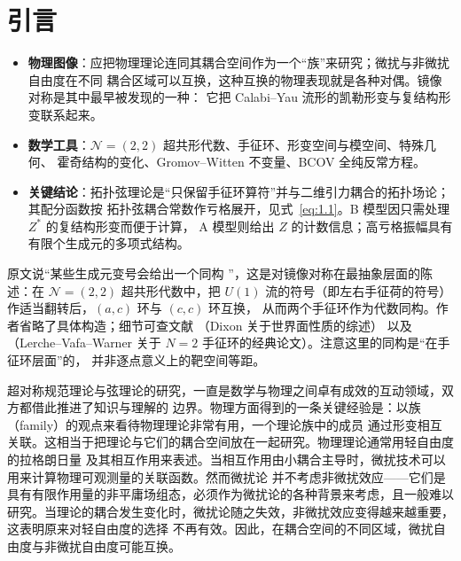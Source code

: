 
\section{引言}
\label{sec:1}


\begin{keytakeaways}
  \begin{itemize}[leftmargin=1.4em,itemsep=2pt,topsep=2pt]
    \item \textbf{物理图像}：应把物理理论连同其耦合空间作为一个“族”来研究；微扰与非微扰自由度在不同
          耦合区域可以互换，这种互换的物理表现就是各种对偶。镜像对称是其中最早被发现的一种：
          它把 Calabi--Yau 流形的凯勒形变与复结构形变联系起来。
    \item \textbf{数学工具}：$\mathcal{N}=(2,2)$ 超共形代数、手征环、形变空间与模空间、特殊几何、
          霍奇结构的变化、Gromov--Witten 不变量、BCOV 全纯反常方程。
    \item \textbf{关键结论}：拓扑弦理论是“只保留手征环算符”并与二维引力耦合的拓扑场论；其配分函数按
          拓扑弦耦合常数作亏格展开，见式~\eqref{eq:1.1}。B 模型因只需处理 $Z^*$ 的复结构形变而便于计算，
          A 模型则给出 $Z$ 的计数信息；高亏格振幅具有有限个生成元的多项式结构。
  \end{itemize}
\end{keytakeaways}

\begin{yizhu}[含糊点]
原文说“某些生成元变号会给出一个同构 \cite{ref4}”，这是对镜像对称在最抽象层面的陈述：在 $\mathcal{N}=(2,2)$
超共形代数中，把 $U(1)$ 流的符号（即左右手征荷的符号）作适当翻转后，$(a,c)$ 环与 $(c,c)$ 环互换，
从而两个手征环作为代数同构。作者省略了具体构造；细节可查文献 \cite{ref4}（Dixon 关于世界面性质的综述）
以及 \cite{ref5}（Lerche--Vafa--Warner 关于 $N=2$ 手征环的经典论文）。注意这里的同构是“在手征环层面”的，
并非逐点意义上的靶空间等距。
\end{yizhu}

超对称规范理论与弦理论的研究，一直是数学与物理之间卓有成效的互动领域，双方都借此推进了知识与理解的
边界。物理方面得到的一条关键经验是：以族（family）的观点来看待物理理论非常有用，一个理论族中的成员
通过形变相互关联。这相当于把理论与它们的耦合空间放在一起研究。物理理论通常用轻自由度的拉格朗日量
及其相互作用来表述。当相互作用由小耦合主导时，微扰技术可以用来计算物理可观测量的关联函数。然而微扰论
并不考虑非微扰效应——它们是具有有限作用量的非平庸场组态，必须作为微扰论的各种背景来考虑，且一般难以
研究。当理论的耦合发生变化时，微扰论随之失效，非微扰效应变得越来越重要，这表明原来对轻自由度的选择
不再有效。因此，在耦合空间的不同区域，微扰自由度与非微扰自由度可能互换。


